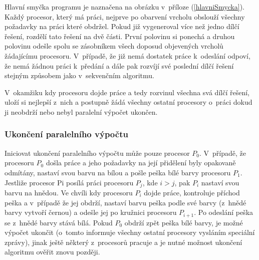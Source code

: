 \documentclass[12pt]{article}
\begin{document}
Hlavní smyčka programu je naznačena na obrázku v~příloze (\ref{hlavniSmycka}). Každý procesor, který má práci, nejprve po obarvení vrcholu obslouží všechny požadavky na práci které obdržel. Pokud již vygeneroval více než jedno dílčí řešení, rozdělí tato řešení na dvě části. První polovinu si ponechá a druhou polovinu odešle spolu se zásobníkem všech doposud objevených vrcholů žádajícímu procesoru. V~případě, že již nemá dostatek práce k~odeslání odpoví, že nemá žádnou práci k~předání a dále pak rozvíjí své poslední dílčí řešení stejným způsobem jako v~sekvenčním algoritmu.

V~okamžiku kdy procesoru dojde práce a tedy rozvinul všechna svá dílčí řešení, uloží si nejlepší z~nich a postupně žádá všechny ostatní procesory o~práci dokud ji neobdrží nebo nebyl paralelní výpočet ukončen.

\subsubsection{Ukončení paralelního výpočtu}

Iniciovat ukončení paralelního výpočtu může pouze procesor $P_0$. V~případě, že procesoru $P_0$ došla práce a jeho požadavky na její přidělení byly opakovaně odmítány, nastaví svou barvu na bílou a pošle peška bílé barvy procesoru $P_1$. Jestliže procesor Pi posílá práci procesoru $P_j$, kde $i>j$, pak $P_i$ nastaví svou barvu na hnědou. Ve chvíli kdy procesoru $P_i$ dojde práce, kontroluje příchod peška a v~případě že jej obdrží, nastaví barvu peška podle své barvy (z~hnědé barvy vytvoří černou) a odešle jej po kružnici procesoru $P_{i+1}$. Po odeslání peška se z~hnědé barvy stává bílá. Pokud $P_0$ obdrží zpět peška bílé barvy, je možné výpočet ukončit (o~tomto informuje všechny ostatní procesory vysláním speciální zprávy), jinak ještě některý z~procesorů pracuje a je nutné možnost ukončení algoritmu ověřit znovu později.
\end{document}
